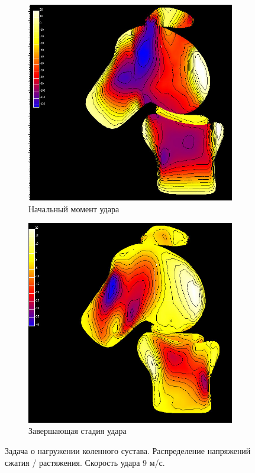 \begin{figure}[H]
\centering
\begin{subfigure}[b]{0.4\textwidth}
\centering
\includegraphics[width=\textwidth]{png/cranium/knee-res-2.png}
\caption{Начальный момент удара}
\end{subfigure}
\begin{subfigure}[b]{0.4\textwidth}
\centering
\includegraphics[width=\textwidth]{png/cranium/knee-res-3.png}
\caption{Завершающая стадия удара}
\end{subfigure}
\caption{Задача о нагружении коленного сустава. Распределение напряжений сжатия / растяжения. Скорость удара 9 м/с.}
\label{pic:knee_res_2}
\end{figure}

